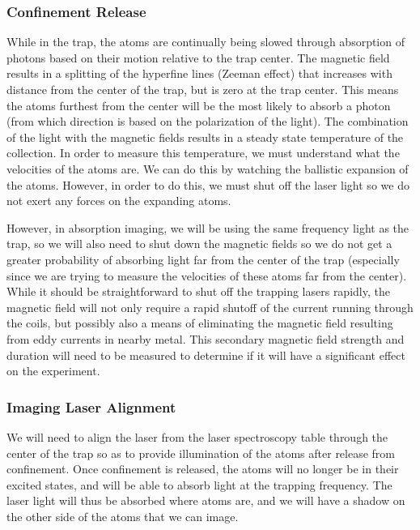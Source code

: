 \documentclass[12pt]{article}
\begin{document}
\subsubsection*{Confinement Release}

	While in the trap, the atoms are continually being slowed through absorption of photons based on their motion relative to the trap center.  The magnetic field results in a splitting of the hyperfine lines (Zeeman effect) that increases with distance from the center of the trap, but is zero at the trap center.  This means the atoms furthest from the center will be the most likely to absorb a photon (from which direction is based on the polarization of the light).  The combination of the light with the magnetic fields results in a steady state temperature of the collection.  In order to measure this temperature, we must understand what the velocities of the atoms are.  We can do this by watching the ballistic expansion of the atoms.  However, in order to do this, we must shut off the laser light so we do not exert any forces on the expanding atoms.
	
	However, in absorption imaging, we will be using the same frequency light as the trap, so we will also need to shut down the magnetic fields so we do not get a greater probability of absorbing light far from the center of the trap (especially since we are trying to measure the velocities of these atoms far from the center).  While it should be straightforward to shut off the trapping lasers rapidly, the magnetic field will not only require a rapid shutoff of the current running through the coils, but possibly also a means of eliminating the magnetic field resulting from eddy currents in nearby metal.  This secondary magnetic field strength and duration will need to be measured to determine if it will have a significant effect on the experiment.
	
\subsubsection*{Imaging Laser Alignment}
	
	We will need to align the laser from the laser spectroscopy table through the center of the trap so as to provide illumination of the atoms after release from confinement.  Once confinement is released, the atoms will no longer be in their excited states, and will be able to absorb light at the trapping frequency.  The laser light will thus be absorbed where atoms are, and we will have a shadow on the other side of the atoms that we can image.
	
\end{document}
